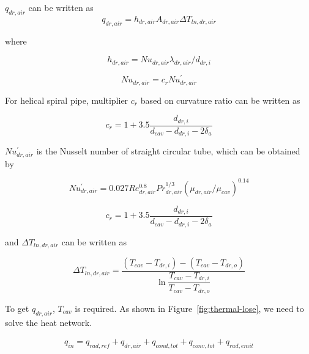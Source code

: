 \documentclass{article}
\begin{document}
$q_{dr,air}$ can be written as
\begin{equation*}
	q_{dr,air}=h_{dr,air}A_{dr,air}\Delta{}T_{ln,dr,air}
\end{equation*}

where

\begin{equation*}
	h_{dr,air}=Nu_{dr,air}\lambda_{dr,air}/d_{dr,i}
\end{equation*}

\begin{equation*}
	Nu_{dr,air}=c_rNu_{dr,air}^{'}
\end{equation*}

For helical spiral pipe, multiplier $c_r$ based on curvature ratio can be written as~\cite{Pablo2008}

\begin{equation*}
	c_{r}=1+3.5\frac{d_{dr,i}}{d_{cav}-d_{dr,i}-2\delta_{a}}
\end{equation*}

$Nu_{dr,air}^{'}$ is the Nusselt number of straight circular tube, which can be obtained by~\cite{Serth2007}

\begin{equation*}
	Nu_{dr,air}^{'}= 0.027Re_{dr,air}^{0.8}Pr_{dr,air}^{1/3}(\mu_{dr,air}/\mu_{cav})^{0.14}
\end{equation*}

\begin{equation*}
	c_{r}=1+3.5\frac{d_{dr,i}}{d_{cav}-d_{dr,i}-2\delta_{a}}
\end{equation*}

and $\Delta{}T_{ln,dr,air}$ can be written as

\begin{equation*}
	\Delta{}T_{ln,dr,air}=\frac{(T_{cav}-T_{dr,i})-(T_{cav}-T_{dr,o})}{\ln\dfrac{T_{cav}-T_{dr,i}}{T_{cav}-T_{dr,o}}}
\end{equation*}

To get $q_{dr,air}$, $T_{cav}$ is required. As shown in Figure~\ref{fig:thermal-lose}, we need to solve the heat network.

\begin{equation}
\begin{aligned}
	q_{in} = q_{rad,ref}+q_{dr,air}+q_{cond,tot}+q_{conv,tot}+q_{rad,emit}\label{eq:q_in sum}
\end{aligned}
\end{equation}
\end{document}
